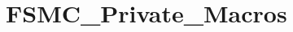 \hypertarget{group___f_s_m_c___private___macros}{\section{F\-S\-M\-C\-\_\-\-Private\-\_\-\-Macros}
\label{group___f_s_m_c___private___macros}
}

